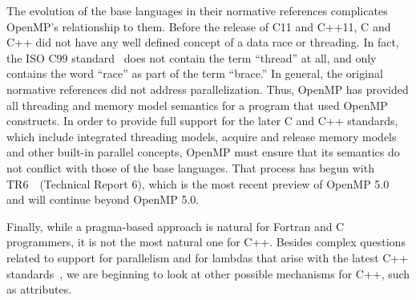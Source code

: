 The evolution of the base languages in their normative references 
complicates OpenMP's relationship to them. Before the release of C11 
and C++11, C and C++ did not have any well defined concept of a data 
race or threading. In fact, the ISO C99 standard~\cite{c99} does not 
contain the term ``thread'' at all, and only contains the word ``race'' 
as part of the term ``brace.'' In general, the original normative references 
did not address parallelization. Thus, OpenMP has provided all threading 
and memory model semantics for a program that used OpenMP constructs. In 
order to provide full support for the later C and C++ standards, which 
include integrated threading models, acquire and release memory models 
and other built-in parallel concepts, OpenMP must ensure that its semantics 
do not conflict with those of the base languages. That process has begun 
with TR6~\cite{openmptr6}~(Technical Report 6), which is the most recent 
preview of OpenMP 5.0 and will continue beyond OpenMP 5.0.

Finally, while a pragma-based approach is natural for Fortran and C 
programmers, it is not the most natural one for C++. Besides complex 
questions related to support for parallelism and for lambdas that arise 
with the latest C++ standards~\cite{c++17}, we are beginning to look at
other possible mechanisms for C++, such as attributes.


